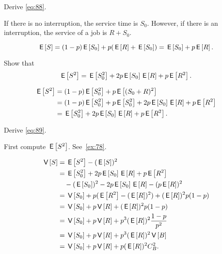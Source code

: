 \begin{exercise}\label{ex:l-256}
Derive \cref{eq:88}.
\begin{hint}
  If there is no interruption, the service time is $S_0$.
  However, if there is an interruption, the service of a job is $R + S_0$.
\end{hint}
\begin{solution}
 \begin{equation*}
 \E{S} = (1-p)\E{S_0} + p (\E{R} + \E{S_0}) = \E{S_0}  + p \E{R}.
 \end{equation*}
\end{solution}
\end{exercise}

\begin{exercise}\label{ex:78}
 Show that
 \begin{equation*}
 \E{S^2} = \E{S_0^2} + 2 p \E{S_0} \E R + p \E{R^2}.
 \end{equation*}
\begin{solution}
 \begin{align*}
 \E{S^2} 
&= (1-p) \E{S_0^2} + p \E{(S_0+R)^2}\\
&= (1-p) \E{S_0^2} + p \E{S_0^2} + 2 p \E{S_0} \E R + p \E{R^2} \\
&=  \E{S_0^2} + 2 p \E{S_0} \E R + p \E{R^2}. 
 \end{align*}
\end{solution}
\end{exercise}

\begin{exercise}\label{ex:l-257}
Derive \cref{eq:89}.
\begin{hint}
 First compute $\E{S^2}$. See~\cref{ex:78}.
\end{hint}
\begin{solution}
 \begin{equation*}
 \begin{split}
\V{S} 
&=\E{S^2} - (\E{S})^2 \\
&= \E{S_0^2} + 2 p \E{S_0} \E R + p \E{R^2} \\
&\quad - (\E{S_0})^2 - 2p \E{S_0}\E R - (p \E R)^2\\
&= \V{S_0} + p(\E{R^2} - (\E R)^2) + (\E R)^2p (1-p) \\
&= \V{S_0} + p\V R + (\E R)^2p (1-p) \\
&= \V{S_0} + p\V R + p^3 (\E R)^2\frac{1-p}{p^2} \\
&= \V{S_0} + p\V R + p^3 (\E R)^2 \V B\\
&= \V{S_0} + p\V R + p (\E R)^2 C^2_B.
 \end{split}
 \end{equation*}
\end{solution}
\end{exercise}




